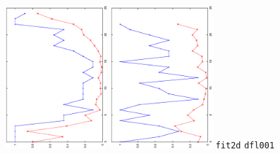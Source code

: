 \begin{figure}[ht]
  \centering
  \includegraphics[width=0.34\textwidth,angle=-90]{figures/fit2d.eps}
  \includegraphics[width=0.34\textwidth,angle=-90]{figures/dfl001.eps}
  {\tt \scriptsize fit2d} \hspace{14em} {\tt \scriptsize dfl001}


\end{figure}
